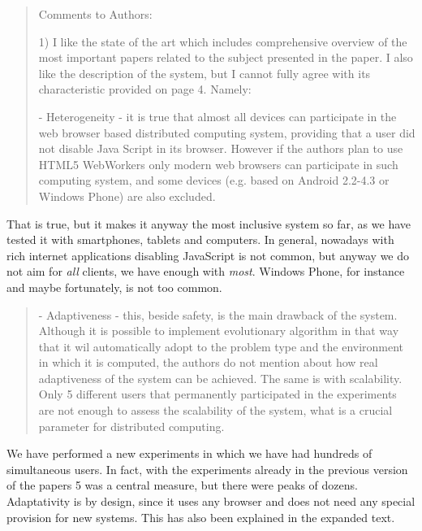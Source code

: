 \documentclass[preprint]{elsarticle}
\begin{document}
\begin{quote}
Comments to Authors:

1) I like the state of the art which includes comprehensive overview of the most important papers related
to the subject presented in the paper. I also like the description of the system, but I cannot fully agree
with its characteristic provided on page 4. Namely:
 
 - Heterogeneity - it is true that almost all devices can participate in the web browser based
 distributed computing system, providing that a user did not disable Java Script in its browser.
 However if the authors plan to use HTML5 WebWorkers only modern web browsers can
 participate in such computing system, and some devices (e.g. based on Android 2.2-4.3 or
 Windows Phone) are also excluded.
 
\end{quote}

That is true, but it makes it anyway the most inclusive system so
far, as we have tested it with smartphones, tablets and computers. In
general, nowadays with rich internet applications disabling JavaScript
is not common, but anyway we do not aim for {\em all} clients, we have
enough with {\em most}. Windows Phone, for instance and maybe
fortunately, is not too common. %

\begin{quote}
 - Adaptiveness - this, beside safety, is the main drawback of the system. Although it is possible to
 implement evolutionary algorithm in that way that it wil automatically adopt to the problem type
 and the environment in which it is computed, the authors do not mention about how real
 adaptiveness of the system can be achieved. The same is with scalability. Only 5 different users
 that permanently participated in the experiments are not enough to assess the scalability of the
 system, what is a crucial parameter for distributed computing.
\end{quote}

We have performed a new experiments in which we have had hundreds of
simultaneous users. In fact, with the experiments already in the
previous version of the papers 5 was a central measure, but there were
peaks of dozens. 
Adaptativity is by design, since it uses any browser and does not need
any special provision for new systems. This has also been explained in
the expanded text.
\end{document}
